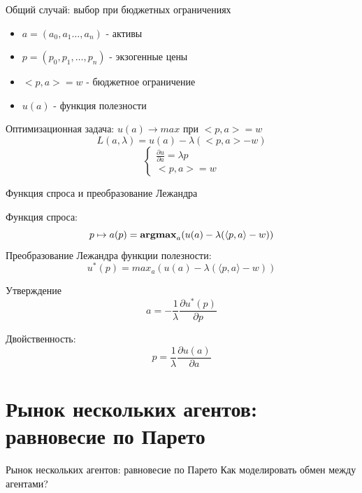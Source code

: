 \documentclass{beamer}
\begin{document}
\begin{frame}{Общий случай: выбор при бюджетных ограничениях}

\begin{itemize}
    \item $a = (a_0, a_1 \ldots, a_n)$ - активы
    \item $p = (p_0, p_1, \ldots, p_n)$ - экзогенные цены
    \item $<p,a> = w$ - бюджетное ограничение
    \item $u(a)$ - функция полезности
\end{itemize}

Оптимизационная задача: $u(a) \to max \text{ при }  <p,a> = w $
$$
L(a,\lambda) = u(a) - \lambda(<p,a> - w)
$$
\begin{equation*}
    \begin{cases}
      \frac{\partial u}{\partial a} = \lambda p\\
      <p,a> = w
    \end{cases}
\end{equation*}


\end{frame}


\begin{frame}{Функция спроса и преобразование Лежандра}

Функция спроса:
$$
p \mapsto a(p) = \mathbf{argmax}_a (u(a) - \lambda(\langle p,a\rangle  - w)) 
$$
Преобразование Лежандра функции полезности:
$$
u^*(p) = max_a (u(a) - \lambda(\langle p,a\rangle - w)) 
$$
\begin{block}{Утверждение}
    $$
a = - \frac{1}{\lambda} \frac{\partial u^*(p)}{\partial p}
$$
\end{block}
Двойственность:
$$
p = \frac{1}{\lambda}\frac{\partial u(a)}{\partial a}
$$
    
\end{frame}

\section{Рынок нескольких агентов: равновесие по Парето}

\begin{frame}{Рынок нескольких агентов: равновесие по Парето}
  \centering
\Large Как моделировать обмен между агентами? 
\end{frame}
\end{document}
